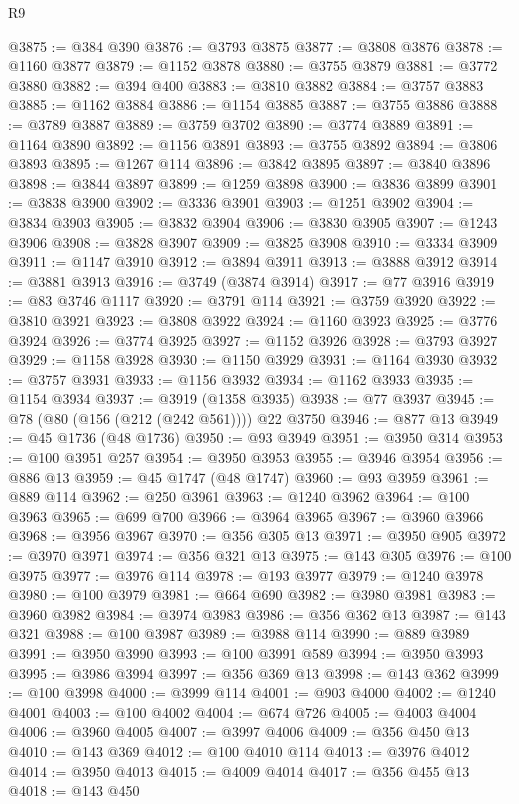 \begin{lexlean}{R9}
\begin{coremodule}
{{{{{{{{{{{{{{{{{{{{{{{{{{{{{{{{{{{{{{{{{{{{{{{{{{{{{{{{{{{{{{{{{{{{{{{{{{{{{{{{{{{{{{{{{{{{{{{{{{{{{{{{{{{{@3875 := @384 @390
@3876 := @3793 @3875
@3877 := @3808 @3876
@3878 := @1160 @3877
@3879 := @1152 @3878
@3880 := @3755 @3879
@3881 := @3772 @3880
@3882 := @394 @400
@3883 := @3810 @3882
@3884 := @3757 @3883
@3885 := @1162 @3884
@3886 := @1154 @3885
@3887 := @3755 @3886
@3888 := @3789 @3887
@3889 := @3759 @3702
@3890 := @3774 @3889
@3891 := @1164 @3890
@3892 := @1156 @3891
@3893 := @3755 @3892
@3894 := @3806 @3893
@3895 := @1267 @114
@3896 := @3842 @3895
@3897 := @3840 @3896
@3898 := @3844 @3897
@3899 := @1259 @3898
@3900 := @3836 @3899
@3901 := @3838 @3900
@3902 := @3336 @3901
@3903 := @1251 @3902
@3904 := @3834 @3903
@3905 := @3832 @3904
@3906 := @3830 @3905
@3907 := @1243 @3906
@3908 := @3828 @3907
@3909 := @3825 @3908
@3910 := @3334 @3909
@3911 := @1147 @3910
@3912 := @3894 @3911
@3913 := @3888 @3912
@3914 := @3881 @3913
@3916 := @3749 (@3874 @3914)
@3917 := @77 @3916
@3919 := @83 @3746 @1117
@3920 := @3791 @114
@3921 := @3759 @3920
@3922 := @3810 @3921
@3923 := @3808 @3922
@3924 := @1160 @3923
@3925 := @3776 @3924
@3926 := @3774 @3925
@3927 := @1152 @3926
@3928 := @3793 @3927
@3929 := @1158 @3928
@3930 := @1150 @3929
@3931 := @1164 @3930
@3932 := @3757 @3931
@3933 := @1156 @3932
@3934 := @1162 @3933
@3935 := @1154 @3934
@3937 := @3919 (@1358 @3935)
@3938 := @77 @3937
@3945 := @78 (@80 (@156 (@212 (@242 @561)))) @22 @3750
@3946 := @877 @13
@3949 := @45 @1736 (@48 @1736)
@3950 := @93 @3949
@3951 := @3950 @314
@3953 := @100 @3951 @257
@3954 := @3950 @3953
@3955 := @3946 @3954
@3956 := @886 @13
@3959 := @45 @1747 (@48 @1747)
@3960 := @93 @3959
@3961 := @889 @114
@3962 := @250 @3961
@3963 := @1240 @3962
@3964 := @100 @3963
@3965 := @699 @700
@3966 := @3964 @3965
@3967 := @3960 @3966
@3968 := @3956 @3967
@3970 := @356 @305 @13
@3971 := @3950 @905
@3972 := @3970 @3971
@3974 := @356 @321 @13
@3975 := @143 @305
@3976 := @100 @3975
@3977 := @3976 @114
@3978 := @193 @3977
@3979 := @1240 @3978
@3980 := @100 @3979
@3981 := @664 @690
@3982 := @3980 @3981
@3983 := @3960 @3982
@3984 := @3974 @3983
@3986 := @356 @362 @13
@3987 := @143 @321
@3988 := @100 @3987
@3989 := @3988 @114
@3990 := @889 @3989
@3991 := @3950 @3990
@3993 := @100 @3991 @589
@3994 := @3950 @3993
@3995 := @3986 @3994
@3997 := @356 @369 @13
@3998 := @143 @362
@3999 := @100 @3998
@4000 := @3999 @114
@4001 := @903 @4000
@4002 := @1240 @4001
@4003 := @100 @4002
@4004 := @674 @726
@4005 := @4003 @4004
@4006 := @3960 @4005
@4007 := @3997 @4006
@4009 := @356 @450 @13
@4010 := @143 @369
@4012 := @100 @4010 @114
@4013 := @3976 @4012
@4014 := @3950 @4013
@4015 := @4009 @4014
@4017 := @356 @455 @13
@4018 := @143 @450
}}}}}}}}}}}}}}}}}}}}}}}}}}}}}}}}}}}}}}}}}}}}}}}}}}}}}}}}}}}}}}}}}}}}}}}}}}}}}}}}}}}}}}}}}}}}}}}}}}}}}}}}}}}}
\end{coremodule}
\end{lexlean}
